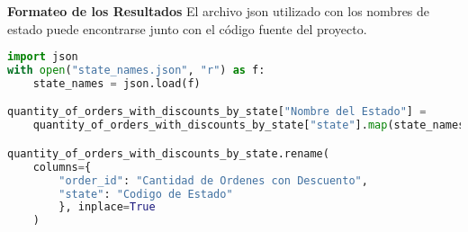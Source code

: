 \textbf{Formateo de los Resultados}
El archivo json utilizado con los nombres de estado puede encontrarse junto con el código fuente del proyecto.
\label{anexo:output_formateo_resultados}
\begin{lstlisting}[language=Python, xleftmargin=70pt, xrightmargin=70pt]
import json
with open("state_names.json", "r") as f:
    state_names = json.load(f)

quantity_of_orders_with_discounts_by_state["Nombre del Estado"] = 
    quantity_of_orders_with_discounts_by_state["state"].map(state_names)

quantity_of_orders_with_discounts_by_state.rename(
    columns={
        "order_id": "Cantidad de Ordenes con Descuento",
        "state": "Codigo de Estado"
        }, inplace=True
    )
\end{lstlisting}